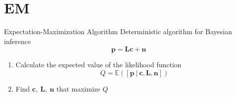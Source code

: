 \documentclass[10pt,xcolor=x11names,compress, notes=show]{beamer}%
\begin{document}
\section{EM}
\begin{frame}{Expectation-Maximization Algorithm}
	Deterministic algorithm for Bayesian inference\\
	
	$$\bm{p} = \bm{Lc} + \bm{n}$$
	
	\begin{enumerate}
		\item Calculate the expected value of the likelihood function
		$$ Q=\mathbb{E}( [\bm{p}~|~\bm{c},\bm{L},\bm{n}])$$
		
		\item Find $\bm{c,~L,~n}$ that maximize $Q$
	\end{enumerate}

\end{frame}
\end{document}
